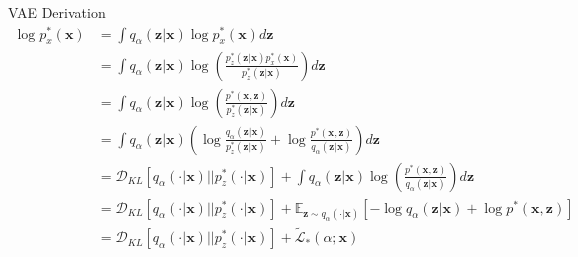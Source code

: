 \documentclass{beamer}
\newcommand{\vect}[1]{\boldsymbol{#1}}
\theoremstyle{definition}
\begin{document}

\begin{frame}{VAE Derivation}
  \scriptsize
\begin{equation*}
  \begin{split}
    \log p_x^*(\vect x) &= \int q_\alpha(\vect z |\vect x) \log p_x^*(\vect x)d\vect z \\
    &= \int q_\alpha(\vect z | \vect x) \log \left( \frac{p_z^*(\vect z | \vect x) p_x^*(\vect x)}{p_z^*(\vect z | \vect x)} \right) d\vect z  \\
    &= \int q_\alpha(\vect z | \vect x) \log \left( \frac{p^*(\vect x, \vect z)}{p_z^*(\vect z | \vect x)} \right) d\vect z\\
    &= \int q_\alpha(\vect z | \vect x) \left( \log \frac{q_\alpha(\vect z | \vect x)}{p_z^*(\vect z | \vect x)} + \log \frac{p^*(\vect x, \vect z)}{q_\alpha(\vect z | \vect x)}\right) d\vect z \\
    &= \mathcal{D}_{KL}\left[ q_\alpha(\cdot |\vect x) \big|\big| p_z^*(\cdot | \vect x) \right] + \int q_\alpha(\vect z | \vect x) \log \left( \frac{p^*(\vect x, \vect z)}{q_\alpha(\vect z | \vect x)} \right)d\vect z \\
    &= \mathcal{D}_{KL}\left[ q_\alpha(\cdot |\vect x) \big|\big| p_z^*(\cdot | \vect x) \right] + {\displaystyle\mathbb{E}_{\vect z\sim q_\alpha(\cdot | \vect x)}}\left[ -\log q_\alpha(\vect z | \vect x) + \log p^*(\vect x, \vect z) \right] \\
    &= \mathcal{D}_{KL}\left[ q_\alpha(\cdot |\vect x) \big|\big| p_z^*(\cdot | \vect x) \right] + \tilde{\mathcal{L}}_*(\alpha; \vect x)
\label{eq:vae_derive}
  \end{split}
\end{equation*}

\end{frame}
\end{document}
